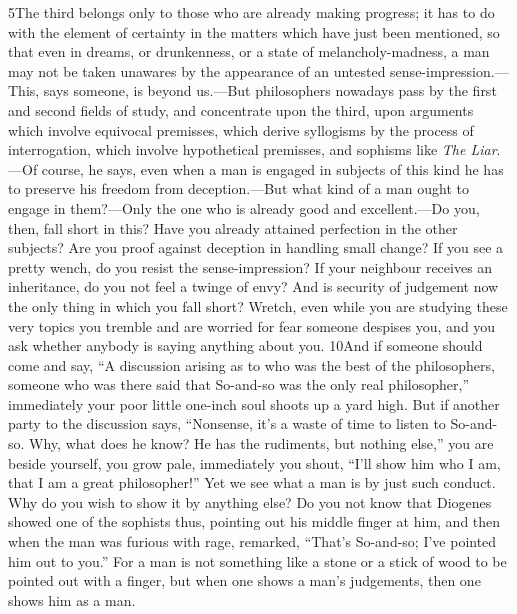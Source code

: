 5The third belongs only to those who are already making progress; it has to do with the element of certainty in the matters which have just been mentioned, so that even in dreams, or drunkenness, or a state of melancholy-madness, a man may not be taken unawares by the appearance of an untested sense-impression.—This, says someone, is beyond us.—But philosophers nowadays pass by the first and second fields of study, and concentrate upon the third, upon arguments which involve equivocal premisses, which derive syllogisms by the process of interrogation, which involve hypothetical premisses, and sophisms like \emph{The Liar}.—Of course, he says, even when a man is engaged in subjects of this kind he has to preserve his freedom from deception.—But what kind of a man ought to engage in them?—Only the one who is already good and excellent.—Do you, then, fall short in this? Have you already attained perfection in the other subjects? Are you proof against deception in handling small change? If you see a pretty wench, do you resist the sense-impression? If your neighbour receives an inheritance, do you not feel a twinge of envy? And is security of judgement now the only thing in which you fall short? Wretch, even while you are studying these very topics you tremble and are worried for fear someone despises you, and you ask whether anybody is saying anything about you. 10And if someone should come and say, ``A discussion arising as to who was the best of the philosophers, someone who was there said that So-and-so was the only real philosopher,'' immediately your poor little one-inch soul shoots up a yard high. But if another party to the discussion says, ``Nonsense, it's a waste of time to listen to So-and-so. Why, what does he know? He has the rudiments, but nothing else,'' you are beside yourself, you grow pale, immediately you shout, ``I'll show him who I am, that I am a great philosopher!'' Yet we see what a man is by just such conduct. Why do you wish to show it by anything else? Do you not know that Diogenes showed one of the sophists thus, pointing out his middle finger at him, and then when the man was furious with rage, remarked, ``That's So-and-so; I've pointed him out to you.'' For a man is not something like a stone or a stick of wood to be pointed out with a finger, but when one shows a man's judgements, then one shows him as a man.

